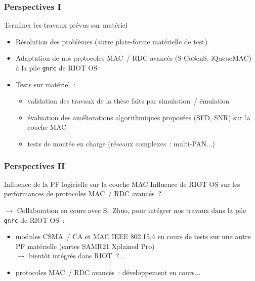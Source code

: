 \documentclass[10pt,c]{beamer}
\begin{document}
\begin{frame}[label=Perspectives1]
\frametitle{Perspectives I}

\begin{block}{Terminer les travaux prévus sur matériel}
\begin{itemize}
\item Résolution des problèmes (autre plate-forme matérielle de test)
\item Adaptation de nos protocoles MAC~/ RDC avancés (S-CoSenS, iQueueMAC)
       à la pile \texttt{gnrc} de RIOT OS
\item Tests sur matériel~:
  \begin{itemize}
  \item validation des travaux de la thèse faits par simulation~/
         émulation
  \item évaluation des améliorations algorithmiques proposées
         (SFD, SNR) sur la couche MAC
  \item tests de montée en charge (réseaux complexes~: multi-PAN...)
  \end{itemize}
\end{itemize}

\end{block}

\end{frame}

\begin{frame}[label=Perspectives2]
\frametitle{Perspectives II}

\begin{exampleblock}{Influence de la PF logicielle sur la couche MAC}
Influence de RIOT OS sur les performances de protocoles MAC~/ RDC avancés~?

\medskip

$\rightarrow$ Collaboration en cours avec S.~Zhuo, pour intégrer
nos travaux dans la pile \texttt{gnrc} de RIOT OS~:
\begin{itemize}
\item modules CSMA~/ CA et MAC IEEE 802.15.4 en cours de
tests sur une autre PF matérielle (cartes SAMR21 Xplained Pro) \\
$\rightarrow$ bientôt intégrés dans RIOT~?...
\item protocoles MAC~/ RDC avancés~: développement en cours...
\end{itemize}
\end{exampleblock}

\end{frame}
\end{document}
